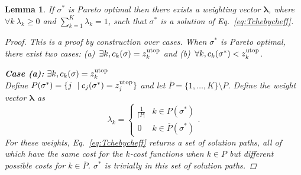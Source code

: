 \documentclass{article}
\newtheorem{lem}{Lemma}
\begin{document}
\begin{lem}
\label{lem:exist_weight}
If $ \sigma^{*} $ is Pareto optimal then there exists a weighting vector $ \bm{\lambda} $, where $ \forall k \ \lambda_k\geq 0$ and $\sum_{k=1}^{K} \lambda_{k} = 1 $, such that $ \sigma^{*} $ is a solution of Eq.~\eqref{eq:Tchebycheff}.
\begin{proof}
This is a proof by construction over cases.  
When $ \sigma^{*} $ is Pareto optimal, there exist two cases: (a)~$ \exists k ,  c_{k}( \sigma ) = z^{\rm utop}_{k} $ and (b)~$ \forall k,  c_{k}( \sigma^{*} ) < z^{\rm utop}_{k} $.

\textit{\textbf{Case (a):}} $ \exists k ,  c_{k}( \sigma ) = z^{\rm utop}_{k} $ \\
Define $ P(\sigma^*)=\{ j \ \mid  c_{j}(\sigma^*)=z_j^{\rm utop}\} $ and let $ \overline{P}=\{1,\ldots,K\} \setminus P $.
Define the weight vector $ \bm{\lambda} $ as 
\begin{equation}
  \lambda_k = \left\{
    \begin{array}{cc}
      \frac{1}{|P|} & k\in P(\sigma^*) \\
      0 & k\in\overline{P}(\sigma^*)
    \end{array}\right..
\end{equation}
For these weights, Eq.~\eqref{eq:Tchebycheff} returns a set of solution paths, all of which have the same cost for the $k$-cost functions when $k\in P$ but different possible costs for $k\in\overline{P}$.  $\sigma^*$ is trivially in this set of solution paths.



\end{proof}
\end{lem}
\end{document}
